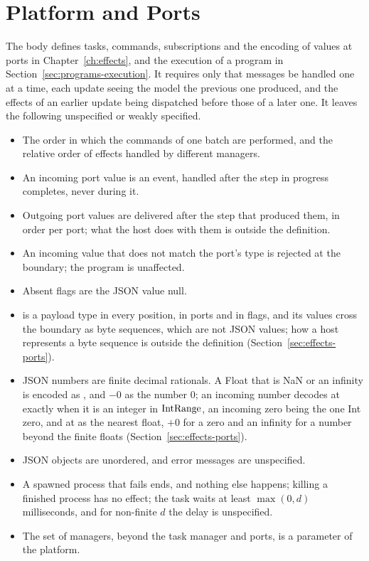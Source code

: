 \section{Platform and Ports}\label{sec:appendix-implementation-platform}

The body defines tasks, commands, subscriptions and the encoding of values at
ports in Chapter~\ref{ch:effects}, and the execution of a program in
Section~\ref{sec:programs-execution}. It requires only that messages be
handled one at a time, each update seeing the model the previous one
produced, and the effects of an earlier update being dispatched before those
of a later one. %
It leaves the following unspecified or weakly specified.
\begin{itemize}
\item The order in which the commands of one batch are performed, and the
  relative order of effects handled by different managers. %
\item An incoming port value is an event, handled after the step in progress
  completes, never during it. %
\item Outgoing port values are delivered after the step that produced them,
  in order per port; what the host does with them is outside the definition.
\item An incoming value that does not match the port's type is rejected at
  the boundary; the program is unaffected. %
\item Absent flags are the JSON value null. %
\item {} is a payload type in every position, in ports and in flags,
  and its values cross the boundary as byte sequences, which are not JSON
  values; how a host represents a byte sequence is outside the definition
  (Section~\ref{sec:effects-ports}). %
\item JSON numbers are finite decimal rationals. A Float that is NaN or an
  infinity is encoded as , and $-0$ as the number $0$; an incoming
  number decodes at  exactly when it is an integer in $\mathrm{IntRange}$, an
  incoming zero being the one Int zero, and at  as the nearest float,
  $+0$ for a zero and an infinity for a number beyond the finite floats
  (Section~\ref{sec:effects-ports}). %
\item JSON objects are unordered, and error messages are unspecified. %
\item A spawned process that fails ends, and nothing else happens; killing a
  finished process has no effect; the task  waits at least
  $\max(0,d)$ milliseconds, and for non-finite $d$ the delay is unspecified.
\item The set of managers, beyond the task manager and ports, is a
  parameter of the platform. %
\end{itemize}


